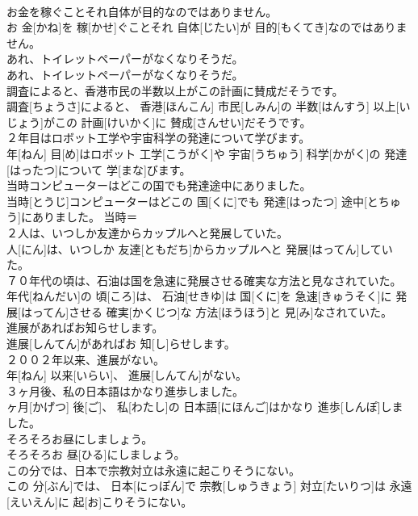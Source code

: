 \documentclass[8pt]{extreport}
\begin{document}
\begin{CJK}{UTF8}{min}
\\	お金を稼ぐことそれ自体が目的なのではありません。	
\\	お 金[かね]を 稼[かせ]ぐことそれ 自体[じたい]が 目的[もくてき]なのではありません。	
\\	あれ、トイレットペーパーがなくなりそうだ。	
\\	あれ、トイレットペーパーがなくなりそうだ。	
\\	調査によると、香港市民の半数以上がこの計画に賛成だそうです。	
\\	調査[ちょうさ]によると、 香港[ほんこん] 市民[しみん]の 半数[はんすう] 以上[いじょう]がこの 計画[けいかく]に 賛成[さんせい]だそうです。	
\\	２年目はロボット工学や宇宙科学の発達について学びます。	
\\	年[ねん] 目[め]はロボット 工学[こうがく]や 宇宙[うちゅう] 科学[かがく]の 発達[はったつ]について 学[まな]びます。	
\\	当時コンピューターはどこの国でも発達途中にありました。	
\\	当時[とうじ]コンピューターはどこの 国[くに]でも 発達[はったつ] 途中[とちゅう]にありました。	当時＝ 
\\	２人は、いつしか友達からカップルへと発展していた。	
\\	人[にん]は、いつしか 友達[ともだち]からカップルへと 発展[はってん]していた。	
\\	７０年代の頃は、石油は国を急速に発展させる確実な方法と見なされていた。	
\\	年代[ねんだい]の 頃[ころ]は、 石油[せきゆ]は 国[くに]を 急速[きゅうそく]に 発展[はってん]させる 確実[かくじつ]な 方法[ほうほう]と 見[み]なされていた。	
\\	進展があればお知らせします。	
\\	進展[しんてん]があればお 知[し]らせします。	
\\	２００２年以来、進展がない。	
\\	年[ねん] 以来[いらい]、 進展[しんてん]がない。	
\\	３ヶ月後、私の日本語はかなり進歩しました。	
\\	ヶ月[かげつ] 後[ご]、 私[わたし]の 日本語[にほんご]はかなり 進歩[しんぽ]しました。	
\\	そろそろお昼にしましょう。	
\\	そろそろお 昼[ひる]にしましょう。	
\\	この分では、日本で宗教対立は永遠に起こりそうにない。	
\\	この 分[ぶん]では、 日本[にっぽん]で 宗教[しゅうきょう] 対立[たいりつ]は 永遠[えいえん]に 起[お]こりそうにない。	

\end{CJK}
\end{document}
